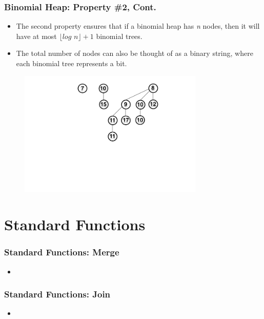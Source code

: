 \documentclass[13pt]{beamer}
\begin{document}
\begin{frame}
\end{frame}

\begin{frame}
\frametitle{Binomial Heap: Property \#2, Cont.}
  \begin{itemize}
    \item The second property ensures that if a binomial heap has \textit{n} nodes, then it will have at most $\lfloor \textit{log n} \rfloor + 1$ binomial trees.
    \item The total number of nodes can also be thought of as a binary string, where each binomial tree represents a bit.
  \end{itemize}

  \begin{figure}
    \includegraphics[height=6cm]{./img/bheap.png}
  \end{figure}

\end{frame}

\section{Standard Functions} %
\begin{frame}
\frametitle{Standard Functions: Merge}
  \begin{itemize}
    \item
  \end{itemize}
\end{frame}

\begin{frame}
\frametitle{Standard Functions: Join}
  \begin{itemize}
    \item
  \end{itemize}
\end{frame}
\end{document}
